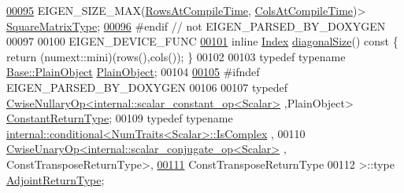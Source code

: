 \begin{DoxyCode}
\hyperlink{group___core___module_a3cf75a9110a1a28c493e124c8a7fcade}{00095}                           EIGEN\_SIZE\_MAX(\hyperlink{group___core___module_a9784b8701c2d1c79fa8000e1b3ebdb8ba41d81bf4037b4d74c03b1242d8c133c0}{RowsAtCompileTime},
      \hyperlink{group___core___module_a9784b8701c2d1c79fa8000e1b3ebdb8bac1b474fd08671c39df677c4acdbc8df0}{ColsAtCompileTime})> \hyperlink{group___core___module_a3cf75a9110a1a28c493e124c8a7fcade}{SquareMatrixType};
\hyperlink{group___core___module_ae1bf94b5a4680abddd29dc4153ad8ba8}{00096} \textcolor{preprocessor}{#endif // not EIGEN\_PARSED\_BY\_DOXYGEN}
00097 
00100     EIGEN\_DEVICE\_FUNC
\hyperlink{group___core___module_a3bcb5338f3ba8a1a5609bd1802a9bc95}{00101}     \textcolor{keyword}{inline} \hyperlink{namespace_eigen_a62e77e0933482dafde8fe197d9a2cfde}{Index} \hyperlink{group___core___module_a3bcb5338f3ba8a1a5609bd1802a9bc95}{diagonalSize}()\textcolor{keyword}{ const }\{ \textcolor{keywordflow}{return} (numext::mini)(rows(),cols()); \}
00102 
00103     \textcolor{keyword}{typedef} \textcolor{keyword}{typename} \hyperlink{group___core___module_aae45af9b5aca5a9caae98fd201f47cc4}{Base::PlainObject} \hyperlink{class_eigen_1_1internal_1_1_tensor_lazy_evaluator_writable}{PlainObject};
00104 
\hyperlink{group___core___module_aef908389c90ade88aafefd7e8f7b024e}{00105} \textcolor{preprocessor}{#ifndef EIGEN\_PARSED\_BY\_DOXYGEN}
00106 
00107     \textcolor{keyword}{typedef} \hyperlink{group___core___module_class_eigen_1_1_cwise_nullary_op}{CwiseNullaryOp<internal::scalar\_constant\_op<Scalar>}
      ,PlainObject> \hyperlink{group___core___module_class_eigen_1_1_cwise_nullary_op}{ConstantReturnType};
00109     \textcolor{keyword}{typedef} \textcolor{keyword}{typename} \hyperlink{struct_eigen_1_1internal_1_1conditional}{internal::conditional<NumTraits<Scalar>::IsComplex}
      ,
00110                         \hyperlink{group___core___module_class_eigen_1_1_cwise_unary_op}{CwiseUnaryOp<internal::scalar\_conjugate\_op<Scalar>}
      , ConstTransposeReturnType>,
\hyperlink{group___core___module_aa93be3d50d662b7bb54bfd346e480675}{00111}                         ConstTransposeReturnType
00112                      >::type \hyperlink{class_eigen_1_1internal_1_1_tensor_lazy_evaluator_writable}{AdjointReturnType};

\end{DoxyCode}

